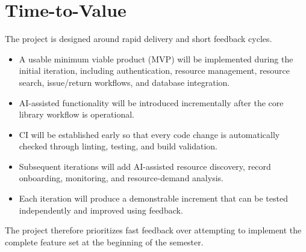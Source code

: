 \documentclass[11pt]{article}
\begin{document}
\section{Time-to-Value}
The project is designed around rapid delivery and short feedback cycles.
\begin{itemize}
    \item A usable minimum viable product (MVP) will be implemented during the initial iteration, including authentication, resource management, resource search, issue/return workflows, and database integration.
    \item AI-assisted functionality will be introduced incrementally after the core library workflow is operational.
    \item CI will be established early so that every code change is automatically checked through linting, testing, and build validation.
    \item Subsequent iterations will add AI-assisted resource discovery, record onboarding, monitoring, and resource-demand analysis.
    \item Each iteration will produce a demonstrable increment that can be tested independently and improved using feedback.
\end{itemize}
The project therefore prioritizes fast feedback over attempting to implement the complete feature set at the beginning of the semester.
\end{document}
